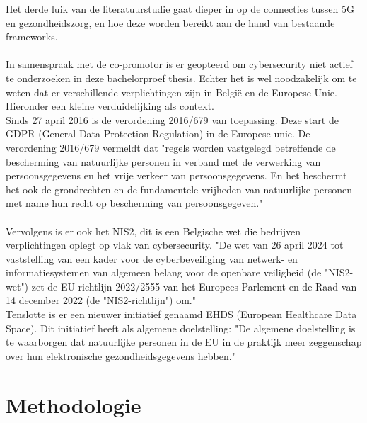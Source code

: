 Het derde luik van de literatuurstudie gaat dieper in op de connecties tussen 5G en gezondheidszorg, en hoe deze worden bereikt aan de hand van bestaande frameworks.
\\\\
In samenspraak met de co-promotor is er geopteerd om cybersecurity niet actief te onderzoeken in deze bachelorproef thesis. Echter het is wel noodzakelijk om te weten dat er verschillende verplichtingen zijn in België en de Europese Unie. Hieronder een kleine verduidelijking als context.
\\
Sinds 27 april 2016 is de verordening 2016/679 van toepassing. Deze start de GDPR (General Data Protection Regulation) in de Europese unie. De verordening 2016/679 vermeldt dat "regels worden vastgelegd betreffende de bescherming van natuurlijke personen in verband met de verwerking van persoonsgegevens en het vrije verkeer van persoonsgegevens. En het beschermt het ook de grondrechten en de fundamentele vrijheden van natuurlijke personen met name hun recht op bescherming van persoonsgegeven."\\ \autocite{gdpr2016} 
\\
Vervolgens is er ook het NIS2, dit is een Belgische wet die bedrijven verplichtingen oplegt op vlak van cybersecurity. "De wet van 26 april 2024 tot vaststelling van een kader voor de cyberbeveiliging van netwerk- en informatiesystemen van algemeen belang voor de openbare veiligheid (de "NIS2-wet") zet de EU-richtlijn 2022/2555 van het Europees Parlement en de Raad van 14 december 2022 (de "NIS2-richtlijn") om." \autocite{Belgium2024}
\\
Tenslotte is er een nieuwer initiatief genaamd EHDS (European Healthcare Data Space). Dit initiatief heeft als algemene doelstelling: "De algemene doelstelling is te waarborgen dat natuurlijke personen in de EU in de praktijk meer zeggenschap over hun elektronische gezondheidsgegevens hebben." \autocite{EHDS2022}


\section{Methodologie}%
\label{sec:methodologie}

